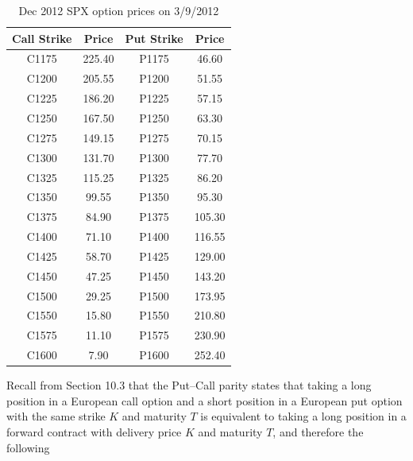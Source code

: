 \begin{table}[H]
\centering
\caption{Dec 2012 SPX option prices on 3/9/2012}
\begin{tabular}{|c|c||c|c|}
\hline
Call Strike & Price & Put Strike & Price \\
\hline
C1175 & 225.40 & P1175 & 46.60 \\
\hline
C1200 & 205.55 & P1200 & 51.55 \\
\hline
C1225 & 186.20 & P1225 & 57.15 \\
\hline
C1250 & 167.50 & P1250 & 63.30 \\
\hline
C1275 & 149.15 & P1275 & 70.15 \\
\hline
C1300 & 131.70 & P1300 & 77.70 \\
\hline
C1325 & 115.25 & P1325 & 86.20 \\
\hline
C1350 & 99.55 & P1350 & 95.30 \\
\hline
C1375 & 84.90 & P1375 & 105.30 \\
\hline
C1400 & 71.10 & P1400 & 116.55 \\
\hline
C1425 & 58.70 & P1425 & 129.00 \\
\hline
C1450 & 47.25 & P1450 & 143.20 \\
\hline
C1500 & 29.25 & P1500 & 173.95 \\
\hline
C1550 & 15.80 & P1550 & 210.80 \\
\hline
C1575 & 11.10 & P1575 & 230.90 \\
\hline
C1600 & 7.90 & P1600 & 252.40 \\
\hline
\end{tabular}
\end{table}

Recall from Section 10.3 that the Put--Call parity states that taking a long position
in a European call option and a short position in a European put option with the same
strike $K$ and maturity $T$ is equivalent to taking a long position in a forward
contract with delivery price $K$ and maturity $T$, and therefore the following
